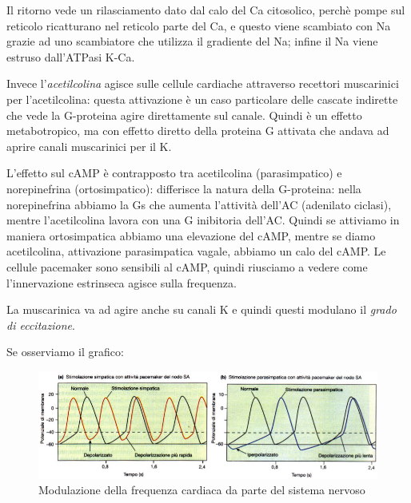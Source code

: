 \documentclass[a4paper,12pt]{article}
\begin{document}
Il ritorno vede un rilasciamento dato dal calo del Ca citosolico, perchè pompe sul reticolo ricatturano nel reticolo parte del Ca, e questo viene scambiato con Na grazie ad uno scambiatore che utilizza il gradiente del Na; infine il Na viene estruso dall'ATPasi K-Ca.

Invece l'\emph{acetilcolina} agisce sulle cellule cardiache attraverso recettori muscarinici per l'acetilcolina: questa attivazione è un caso particolare delle cascate indirette che vede la G-proteina agire direttamente sul canale. Quindi è un effetto metabotropico, ma con effetto diretto della proteina G attivata che andava ad aprire canali muscarinici per il K.

L'effetto sul cAMP è contrapposto tra acetilcolina (parasimpatico) e norepinefrina (ortosimpatico): differisce la natura della G-proteina: nella norepinefrina abbiamo la Gs che aumenta l'attività dell'AC (adenilato ciclasi), mentre l'acetilcolina lavora con una G inibitoria dell'AC. Quindi se attiviamo in maniera ortosimpatica abbiamo una elevazione del cAMP, mentre se diamo acetilcolina, attivazione parasimpatica vagale, abbiamo un calo del cAMP. Le cellule pacemaker sono sensibili al cAMP, quindi riusciamo a vedere come l'innervazione estrinseca agisce sulla frequenza.

La muscarinica va ad agire anche su canali K e quindi questi modulano il \emph{grado di eccitazione}.

Se osserviamo il grafico:
\begin{figure}[H]
\centering
\includegraphics[scale=0.5]{immagine/stimolo.jpg}
\caption{Modulazione della frequenza cardiaca da parte del sistema nervoso}
\end{figure}
\end{document}
